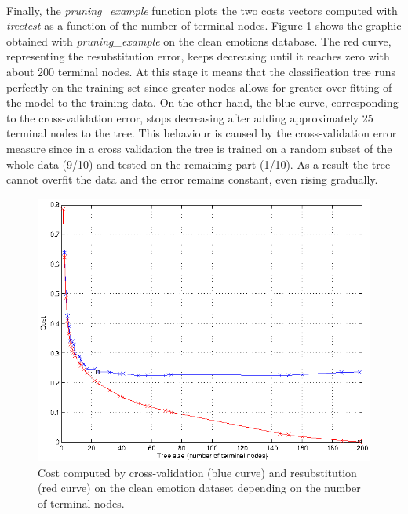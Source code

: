 \documentclass[a4paper,12pt,oneside,final]{report}
\begin{document}
\paragraph{}
Finally, the \textit{pruning\_example} function plots the two costs vectors computed with \textit{treetest} as a function of the number of terminal nodes. Figure \ref{fig:pruning} shows the graphic obtained with \textit{pruning\_example} on the clean emotions database. 
The red curve, representing the resubstitution error, keeps decreasing until it reaches zero with about 200 terminal nodes. At this stage it means that the classification tree runs perfectly on the training set since greater nodes allows for greater over fitting of the model to the training data. On the other hand, the blue curve, corresponding to the cross-validation error, stops decreasing after adding approximately 25 terminal nodes to the tree. This behaviour is caused by the cross-validation error measure since in a cross validation the tree is trained on a random subset of the whole data (9/10) and tested on the remaining part (1/10). As a result the tree cannot overfit the data and the error remains constant, even rising gradually.

\begin{figure}[!h]
\center
\includegraphics{pruning_example_clean.png}
\caption[Pruning example on clean data.]{Cost computed by cross-validation (blue curve) and resubstitution (red curve) on the clean emotion dataset depending on the number of terminal nodes. \label{fig:pruning}}
\end{figure}
\FloatBarrier
\end{document}
